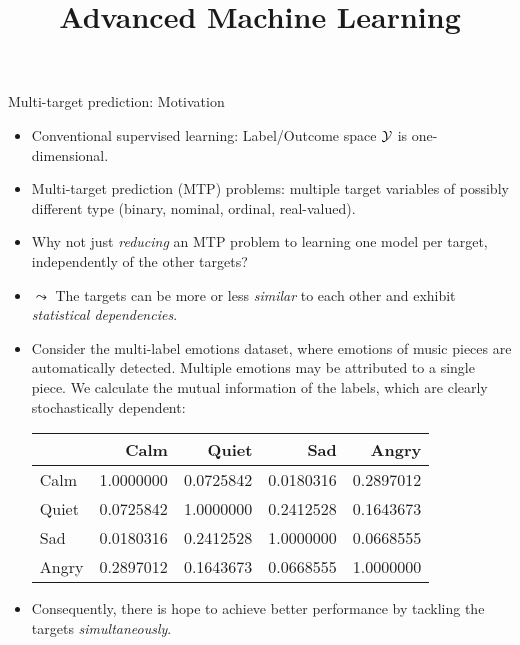 \documentclass[11pt,compress,t,notes=noshow, xcolor=table]{beamer}
\title{Advanced Machine Learning}
\date{}
\begin{document}



\sloppy

\begin{vbframe}{Multi-target prediction: Motivation}
\scriptsize{
    \begin{itemize}    
        \item Conventional supervised learning: Label/Outcome space $\mathcal{Y}$ is one-dimensional.	

            \item Multi-target prediction (MTP) problems: multiple target variables of possibly different type (binary, nominal, ordinal, real-valued).
            
            \item Why not just \emph{reducing} an MTP problem to learning one model per target, independently of the other targets? 
        \hfill

		\item $\leadsto$ The targets can be more or less \emph{similar} to each other and exhibit \emph{statistical dependencies}.

        \item Consider the multi-label emotions dataset, where emotions of music pieces are automatically detected. Multiple emotions may be attributed to a single piece. We calculate the mutual information of the labels, which are clearly stochastically dependent:
        \vspace{10pt}
        \begin{center}
            \begin{tabular}{lrrrr}
\toprule
  & Calm & Quiet & Sad & Angry\\
\midrule
Calm & 1.0000000 & 0.0725842 & 0.0180316 & 0.2897012\\
Quiet & 0.0725842 & 1.0000000 & 0.2412528 & 0.1643673\\
Sad & 0.0180316 & 0.2412528 & 1.0000000 & 0.0668555\\
Angry & 0.2897012 & 0.1643673 & 0.0668555 & 1.0000000\\
\bottomrule
\end{tabular}
        \end{center}
	\vspace{10pt}
		\item Consequently, there is hope to achieve better performance by tackling the targets \emph{simultaneously}.

    \end{itemize}}

\end{vbframe}
\end{document}
